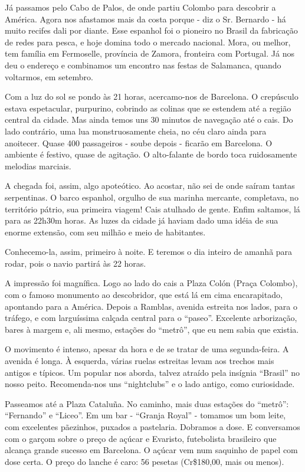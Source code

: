 Já passamos pelo Cabo de Palos, de onde partiu Colombo para descobrir a América. Agora nos afastamos mais da costa porque - diz o Sr. Bernardo - há muito recifes dali por diante. Esse espanhol foi o pioneiro no Brasil da fabricação de redes para pesca, e hoje domina todo o mercado nacional. Mora, ou melhor, tem família em Fermoselle, província de Zamora, fronteira com Portugal. Já nos deu o endereço e combinamos um encontro nas festas de Salamanca, quando voltarmos, em setembro.

Com a luz do sol se pondo às 21 horas, acercamo-nos de Barcelona. O crepúsculo estava espetacular, purpurino, cobrindo as colinas que se estendem até a região central da cidade. Mas ainda temos uns 30 minutos de navegação até o cais. Do lado contrário, uma lua monstruosamente cheia, no céu claro ainda para anoitecer. Quase 400 passageiros - soube depois - ficarão em Barcelona. O ambiente é festivo, quase de agitação. O alto-falante de bordo toca ruidosamente melodias marciais.

A chegada foi, assim, algo apoteótico. Ao acostar, não sei de onde saíram tantas serpentinas. O barco espanhol, orgulho de sua marinha mercante, completava, no território pátrio, sua primeira viagem! Cais atulhado de gente. Enfim saltamos, lá para as 22h30m horas. As luzes da cidade já haviam dado uma idéia de sua enorme extensão, com seu milhão e meio de habitantes.

Conhecemo-la, assim, primeiro à noite. E teremos o dia inteiro de amanhã para rodar, pois o navio partirá às 22 horas.

A impressão foi magnífica. Logo ao lado do cais a Plaza Colón (Praça Colombo), com o famoso monumento ao descobridor, que está lá em cima encarapitado, apontando para a América. Depois a Ramblas, avenida estreita nos lados, para o tráfego, e com larguíssima calçada central para o “paseo”. Excelente arborização, bares à margem e, ali mesmo, estações do “metrô”, que eu nem sabia que existia.

O movimento é intenso, apesar da hora e de se tratar de uma segunda-feira. A avenida é longa. À esquerda, várias ruelas estreitas levam aos trechos mais antigos e típicos. Um popular nos aborda, talvez atraído pela insígnia “Brasil” no nosso peito. Recomenda-nos uns “nightclubs” e o lado antigo, como curiosidade.

Passeamos até a Plaza Cataluña. No caminho, mais duas estações do “metrô”: “Fernando” e “Liceo”. Em um bar - “Granja Royal” - tomamos um bom leite, com excelentes pãezinhos, puxados a pastelaria. Dobramos a dose. E conversamos com o garçom sobre o preço de açúcar e Evaristo, futebolista brasileiro que alcança grande sucesso em Barcelona. O açúcar vem num saquinho de papel com dose certa. O preço do lanche é caro: 56 pesetas (Cr\$180,00, mais ou menos).


